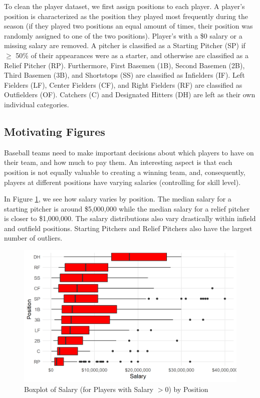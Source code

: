 \documentclass{article}
\begin{document}
To clean the player dataset, we first assign positions to each player. A player's position is characterized as the position they played most frequently during the season (if they played two positions an equal amount of times, their position was randomly assigned to one of the two positions). Player's with a \$0 salary or a missing salary are removed. A pitcher is classified as a Starting Pitcher (SP) if $\geq$ 50\% of their appearances were as a starter, and otherwise are classified as a Relief Pitcher (RP). Furthermore, First Basemen (1B), Second Basemen (2B), Third Basemen (3B), and Shortstops (SS) are classified as Infielders (IF). Left Fielders (LF), Center Fielders (CF), and Right Fielders (RF) are classified as Outfielders (OF). Catchers (C) and Designated Hitters (DH) are left as their own individual categories. 

\subsection{Motivating Figures}

Baseball teams need to make important decisions about which players to have on their team, and how much to pay them. An interesting aspect is that each position is not equally valuable to creating a winning team, and, consequently, players at different positions have varying salaries (controlling for skill level). 

In Figure \ref{fig:salary_position_boxplot}, we see how salary varies by position. The median salary for a starting pitcher is around \$5,000,000 while the median salary for a relief pitcher is closer to \$1,000,000. The salary distributions also vary drastically within infield and outfield positions. Starting Pitchers and Relief Pitchers also have the largest number of outliers.

\begin{figure}[H]
\caption{Boxplot of Salary (for Players with Salary $> 0$) by Position}
\label{fig:salary_position_boxplot}
\centering
\includegraphics[width=0.7\paperwidth, scale=1.25]{salary_position_boxplots.png}
\end{figure}
\end{document}
